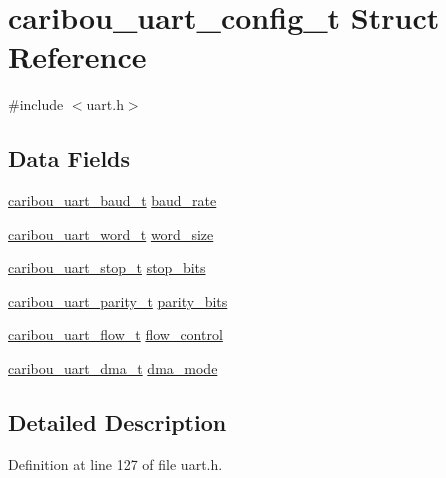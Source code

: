 \hypertarget{structcaribou__uart__config__t}{\section{caribou\-\_\-uart\-\_\-config\-\_\-t Struct Reference}
\label{structcaribou__uart__config__t}
}


{\ttfamily \#include $<$uart.\-h$>$}

\subsection*{Data Fields}
\begin{DoxyCompactItemize}
\item 
\hyperlink{uart_8h_afef1566c0e2499ac54d03f9840e67367}{caribou\-\_\-uart\-\_\-baud\-\_\-t} \hyperlink{structcaribou__uart__config__t_a6138aeea535f2b07ffe791cf77805e78}{baud\-\_\-rate}
\item 
\hyperlink{uart_8h_a9a6df27e70711dcf554553bcd934cdf9}{caribou\-\_\-uart\-\_\-word\-\_\-t} \hyperlink{structcaribou__uart__config__t_a89d25d0eefe1f3856ccc6568026e00b1}{word\-\_\-size}
\item 
\hyperlink{uart_8h_a8a7a8a9e91ed00784943f12dd2b3825e}{caribou\-\_\-uart\-\_\-stop\-\_\-t} \hyperlink{structcaribou__uart__config__t_a9489f3e6667476da945ac8b99543e9c0}{stop\-\_\-bits}
\item 
\hyperlink{uart_8h_a21331436e5b880d78970abb6dbfad09b}{caribou\-\_\-uart\-\_\-parity\-\_\-t} \hyperlink{structcaribou__uart__config__t_aeb5a0f9cc2e23070859bcb7033777e14}{parity\-\_\-bits}
\item 
\hyperlink{uart_8h_a54948edc934015197b158136f30a074d}{caribou\-\_\-uart\-\_\-flow\-\_\-t} \hyperlink{structcaribou__uart__config__t_a94d7122367d7664b02df609cbae278c2}{flow\-\_\-control}
\item 
\hyperlink{uart_8h_abc83350727ee87e6056c52670ef81707}{caribou\-\_\-uart\-\_\-dma\-\_\-t} \hyperlink{structcaribou__uart__config__t_a257b346e7b980b0f2b089f27cc54569d}{dma\-\_\-mode}
\end{DoxyCompactItemize}


\subsection{Detailed Description}


Definition at line 127 of file uart.\-h.



